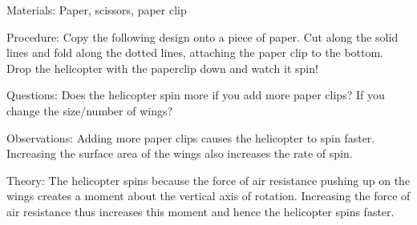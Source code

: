 \begin{multicols}{2}
\begin{description*}
\item[Materials:]{Paper, scissors, paper clip}
\item[Procedure:]{Copy the following design onto a piece of paper. Cut along the solid lines and fold along the dotted lines, attaching the paper clip to the bottom. Drop the helicopter with the paperclip down and watch it spin!}
\item[Questions:]{Does the helicopter spin more if you add more paper clips? If you change the size/number of wings?}
\item[Observations:]{Adding more paper clips causes the helicopter to spin faster. Increasing the surface area of the wings also increases the rate of spin.}
\item[Theory:]{The helicopter spins because the force of air resistance pushing up on the wings creates a moment about the vertical axis of rotation. Increasing the force of air resistance thus increases this moment and hence the helicopter spins faster.}
\end{description*}


\end{multicols}

\pagebreak